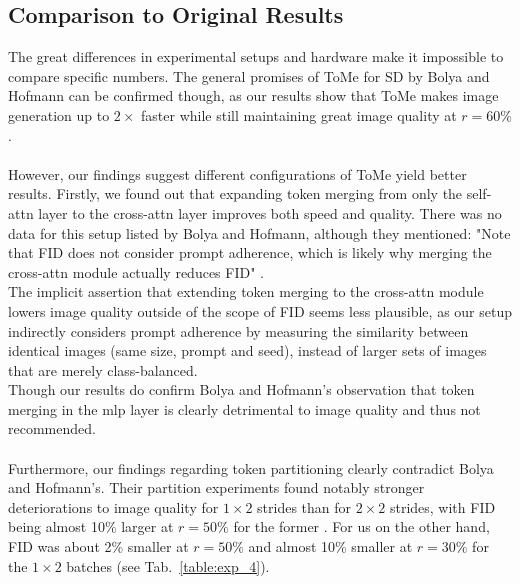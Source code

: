 \subsection{Comparison to Original Results}
The great differences in experimental setups and hardware make it impossible to compare specific numbers. The general promises of ToMe for SD by Bolya and Hofmann can be confirmed though, as our results show that ToMe makes image generation up to $2 \times$ faster while still maintaining great image quality at \(r = 60\%\).\\
\\
However, our findings suggest different configurations of ToMe yield better results.
Firstly, we found out that expanding token merging from only the self-attn layer to the cross-attn layer improves both speed and quality. There was no data for this setup listed by Bolya and Hofmann, although they mentioned: "Note that FID does not consider prompt adherence, which is likely why merging the cross-attn module actually reduces FID" \cite{bolya2023tomesd}. \\
The implicit assertion that extending token merging to the cross-attn module lowers image quality outside of the scope of FID seems less plausible, as our setup indirectly considers prompt adherence by measuring the similarity between identical images (same size, prompt and seed), instead of larger sets of images that are merely class-balanced.\\
Though our results do confirm Bolya and Hofmann's observation that token merging in the mlp layer is clearly detrimental to image quality and thus not recommended.\\
\\
Furthermore, our findings regarding token partitioning clearly contradict Bolya and Hofmann's. Their partition experiments found notably stronger deteriorations to image quality for $1 \times 2$ strides than for $2 \times 2$ strides, with FID being almost 10\% larger at \(r=50\%\) for the former \cite[Tab.~2 (a)]{bolya2023tomesd}. For us on the other hand, FID was about 2\% smaller at \(r=50\%\) and almost 10\% smaller at \(r=30\%\) for the $1 \times 2$ batches (see Tab.~\ref{table:exp_4}). 
